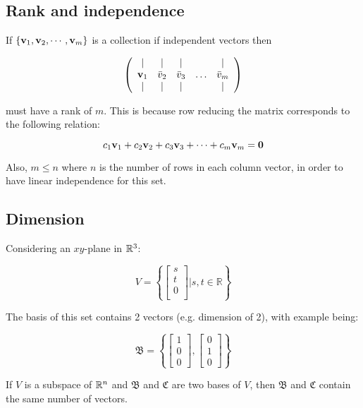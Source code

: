 \subsection{Rank and independence}

If $\{\textbf{v}_1,\textbf{v}_2,\cdots ,\textbf{v}_m\}$ is a collection if independent vectors then

\[
\left(\begin{array}{ccccc}
\mid & \mid & \mid & & \mid \\
\textbf{v}_{1} & \bar{v}_{2} & \bar{v}_{3} & \ldots & \bar{v}_{m} \\
\mid & \mid & \mid & & \mid
\end{array}\right)
\]

must have a rank of $m$. This is because row reducing the matrix corresponds to the following relation:

\[c_1\textbf{v}_1+c_2\textbf{v}_2+c_3\textbf{v}_3+\dots +c_m\textbf{v}_m=\textbf{0}\]

\noindent
Also, $m\leq n$ where $n$ is the number of rows in each column vector, in order to have linear independence for this set.

\subsection{Dimension}

Considering an $xy$-plane in $\mathbb{R}^3$:

\[V=\left\{\begin{bmatrix}s\\t\\0\\ \end{bmatrix}\Bigg| s,t \in \mathbb{R} \right\}\]

The basis of this set contains 2 vectors (e.g. dimension of 2), with example being:

\[\mathfrak{B}=\left\{\begin{bmatrix}1\\0\\0 \end{bmatrix} , \begin{bmatrix} 0\\1\\0 \end{bmatrix} \right\}\]

\begin{framed}
    If $V$ is a subspace of $\mathbb{R}^n$ and $\mathfrak{B}$ and $\mathfrak{C}$ are two bases of $V$, then
    $\mathfrak{B}$ and $\mathfrak{C}$ contain the same number of vectors.
\end{framed}

